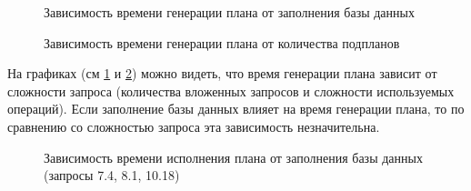 \documentclass[a4paper,12pt]{article}
\begin{document}
\begin{figure}[h]
	\noindent{}
	\caption{Зависимость времени генерации плана от заполнения базы данных}
	\label{img::gen1}
\end{figure}

\begin{figure}[h]
	\noindent{}
	\caption{Зависимость времени генерации плана от количества подпланов}
	\label{img::gen2}
\end{figure}

На графиках (см \ref{img::gen1} и \ref{img::gen2}) можно видеть, что время генерации плана зависит от сложности 
запроса (количества вложенных запросов и сложности используемых операций). Если заполнение базы данных влияет на
время генерации плана, то по сравнению со сложностью запроса эта зависимость незначительна.

\begin{figure}[h]
	\noindent{}
	\caption{Зависимость времени исполнения плана от заполнения базы данных (запросы 7.4, 8.1, 10.18)}
	\label{img::exec1}
\end{figure}
\end{document}
